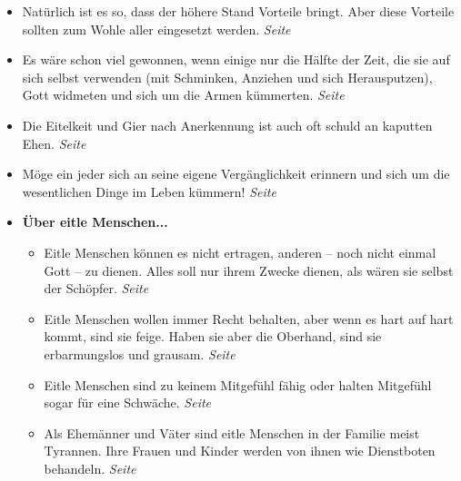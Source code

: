 \begin{itemize}
 \item Natürlich ist es so, dass der höhere Stand Vorteile bringt. Aber diese
Vorteile sollten zum Wohle aller eingesetzt werden.
 \dotfill \textit{Seite~\pageref{ref:11_07_standesvorteil}}\\

 \item Es wäre schon viel gewonnen, wenn einige nur die Hälfte der Zeit, die sie
auf sich selbst verwenden (mit Schminken, Anziehen und sich Herausputzen), Gott
widmeten und sich um die Armen kümmerten.
 \dotfill \textit{Seite~\pageref{ref:11_09_putzsucht}}\\

 \item Die Eitelkeit und Gier nach Anerkennung ist auch oft schuld an
kaputten Ehen.
 \dotfill \textit{Seite~\pageref{ref:11_09_kaputte_ehen}}\\

 \item Möge ein jeder sich an seine eigene Vergänglichkeit erinnern und sich um
die wesentlichen Dinge im Leben kümmern!
 \dotfill \textit{Seite
\pageref{ref:11_10_juengstes_gericht}}\\

 \item \textbf{Über eitle Menschen...}

\begin{itemize}
 \item Eitle Menschen können es nicht ertragen, anderen -- noch nicht einmal Gott --
zu dienen. Alles soll nur ihrem Zwecke dienen, als wären sie selbst der
Schöpfer.
 \dotfill \textit{Seite~\pageref{ref:12_01_egoisten}}\\

 \item Eitle Menschen wollen immer Recht behalten, aber wenn es hart auf hart
kommt, sind sie feige. Haben sie aber die Oberhand, sind sie erbarmungslos und
grausam.
 \dotfill \textit{Seite~\pageref{ref:12_02_eitle_menschen_streit}}\\

 \item Eitle Menschen sind zu keinem Mitgefühl fähig oder halten Mitgefühl sogar
für eine Schwäche.
 \dotfill \textit{Seite~\pageref{ref:12_02_eitle_menschen_mitgefuehl}}\\

 \item Als Ehemänner und Väter sind eitle Menschen in der
Familie meist Tyrannen. Ihre Frauen und Kinder werden von ihnen wie Dienstboten behandeln.
 \dotfill \textit{Seite~\pageref{ref:12_03_eitle_menschen_ehe}}\\


\end{itemize}
\end{itemize}
